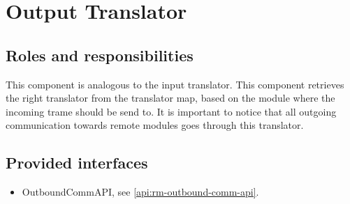 \section{Output Translator}
\label{element:rm-output-translator}

\subsection{Roles and responsibilities}

\npar This component is analogous to the input translator. This
component retrieves the right translator from the translator map, based on the
module where the incoming trame should be send to. It is important to notice
that all outgoing communication towards remote modules goes through this
translator.

\subsection{Provided interfaces}

\begin{itemize}
  \item OutboundCommAPI, see \ref{api:rm-outbound-comm-api}.
\end{itemize}